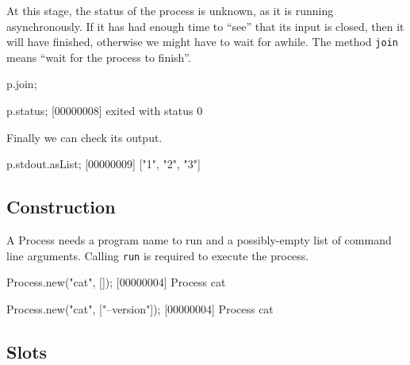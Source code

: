 \noindent
At this stage, the status of the process is unknown, as it is running
asynchronously.  If it has had enough time to ``see'' that its input
is closed, then it will have finished, otherwise we might have to wait
for awhile.  The method \lstinline|join| means ``wait for the process
to finish''.

\begin{urbiscript}
p.join;

p.status;
[00000008] exited with status 0
\end{urbiscript}

\noindent
Finally we can check its output.

\begin{urbiscript}
p.stdout.asList;
[00000009] ["1", "2", "3"]
\end{urbiscript}

\subsection{Construction}

A Process needs a program name to run and a possibly-empty list of
command line arguments.  Calling \lstinline|run| is required to
execute the process.

\begin{urbiscript}
Process.new("cat", []);
[00000004] Process cat

Process.new("cat", ["--version"]);
[00000004] Process cat
\end{urbiscript}

\subsection{Slots}

